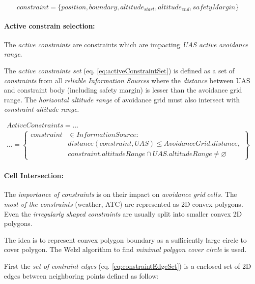 \begin{equation}\label{eq:staticConstraint}
    constraint = \{position,boundary, altitude_{start},altitude_{end}, safety Margin\}
\end{equation}

\paragraph{Active constrain selection:} The \emph{active constraints} are constraints which are impacting \emph{UAS active avoidance range}. 

The \emph{active constraints set} (eq. \ref{eq:activeConstraintSet}) is defined as a set of \emph{constraints} from all \emph{reliable Information Sources} where the \emph{distance} between UAS and constraint body (including safety margin) is lesser than the avoidance grid range. The \emph{horizontal altitude range} of avoidance grid must also intersect with \emph{constraint altitude range}.

\begin{multline}\label{eq:activeConstraintSet}
    Active Constraints = \dots\\\dots =
    \left\{\begin{aligned}constraint& \in Information Source:\\ 
    &distance(constraint,UAS) \le Avoidance Grid. distance,\\
    &constraint.altitude Range \cap UAS.altitude Range \neq \varnothing 
    \end{aligned}\right\}
\end{multline}

\paragraph{Cell Intersection:} The \emph{importance of constraints} is on their impact on \emph{avoidance grid} $cells$. The \emph{most of the constraints} (weather, ATC) are represented as 2D convex polygons. Even the \emph{irregularly shaped constraints} are usually split into smaller convex 2D polygons.

The idea is to represent convex polygon boundary as a sufficiently large circle to cover polygon. The Welzl algorithm to find \emph{minimal polygon cover circle} \cite{welzl1991smallest} is used.

First the \emph{set of contraint edges} (eq. \ref{eq:constraintEdgeSet}) is a enclosed set of 2D edges between neighboring points defined as follow:

